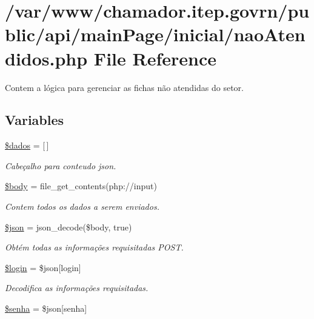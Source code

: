\hypertarget{nao_atendidos_8php}{}\section{/var/www/chamador.itep.\+govrn/public/api/main\+Page/inicial/nao\+Atendidos.php File Reference}
\label{nao_atendidos_8php}


Contem a lógica para gerenciar as fichas não atendidas do setor.  


\subsection*{Variables}
\begin{DoxyCompactItemize}
\item 
\hyperlink{nao_atendidos_8php_a252370d95039a38fa11afab784725d58}{\$dados} = \mbox{[}$\,$\mbox{]}
\begin{DoxyCompactList}\small\item\em Cabeçalho para conteudo json. \end{DoxyCompactList}\item 
\hyperlink{nao_atendidos_8php_a26b9f9373f7bb79dfcf8a86dff086b45}{\$body} = file\+\_\+get\+\_\+contents(\textquotesingle{}php\+://input\textquotesingle{})
\begin{DoxyCompactList}\small\item\em Contem todos os dados a serem enviados. \end{DoxyCompactList}\item 
\hyperlink{nao_atendidos_8php_acedd13b51401130848ce18f4d5c52605}{\$json} = json\+\_\+decode(\$body, true)
\begin{DoxyCompactList}\small\item\em Obtém todas as informações requisitadas P\+O\+ST. \end{DoxyCompactList}\item 
\hyperlink{nao_atendidos_8php_afc31993e855f9631572adfedcfe6f34b}{\$login} = \$json\mbox{[}\textquotesingle{}login\textquotesingle{}\mbox{]}
\begin{DoxyCompactList}\small\item\em Decodifica as informações requisitadas. \end{DoxyCompactList}\item 
\hyperlink{nao_atendidos_8php_a3678c8769c9698fd30581c1016c5f475}{\$senha} = \$json\mbox{[}\textquotesingle{}senha\textquotesingle{}\mbox{]}

\end{DoxyCompactItemize}
